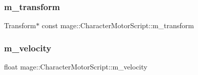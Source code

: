 \subsubsection{\texorpdfstring{m\+\_\+transform}{m\_transform}}
{\footnotesize\ttfamily Transform$\ast$ const mage\+::\+Character\+Motor\+Script\+::m\+\_\+transform\hspace{0.3cm}{\ttfamily [private]}}

\hypertarget{classmage_1_1_character_motor_script_a02441cc4c84ba12811845b7f966f4069}{}\label{classmage_1_1_character_motor_script_a02441cc4c84ba12811845b7f966f4069} 
\subsubsection{\texorpdfstring{m\+\_\+velocity}{m\_velocity}}
{\footnotesize\ttfamily float mage\+::\+Character\+Motor\+Script\+::m\+\_\+velocity\hspace{0.3cm}{\ttfamily [private]}}


